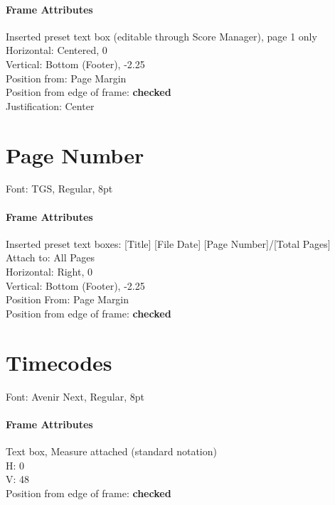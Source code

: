 \documentclass[unicode,hyperfootnotes=false,xetex,colorlinks=true,nofonts,nobib]{tufte-book} %
\begin{document}
\paragraph{Frame Attributes}
\label{sec:frame-attributes-3}

Inserted preset text box (editable through Score Manager), page 1 only\\
Horizontal: Centered, 0\\
Vertical: Bottom (Footer), -2.25\\
Position from: Page Margin\\
Position from edge of frame: \textbf{checked}\\
Justification: Center

\section{Page Number}
\label{sec:page-number}

Font: TGS, Regular, 8pt

\paragraph{Frame Attributes}
\label{sec:frame-attributes-4}

Inserted preset text boxes: [Title] [File Date] [Page Number]/[Total Pages]\\
Attach to: All Pages\\
Horizontal: Right, 0\\
Vertical: Bottom (Footer), -2.25\\
Position From: Page Margin\\
Position from edge of frame: \textbf{checked}

\section{Timecodes}
\label{sec:timecodes}

Font: Avenir Next, Regular, 8pt

\paragraph{Frame Attributes}
\label{sec:frame-attributes-5}

Text box, Measure attached (standard notation)\\
H: 0\\
V: 48\\
Position from edge of frame: \textbf{checked}
\end{document}
